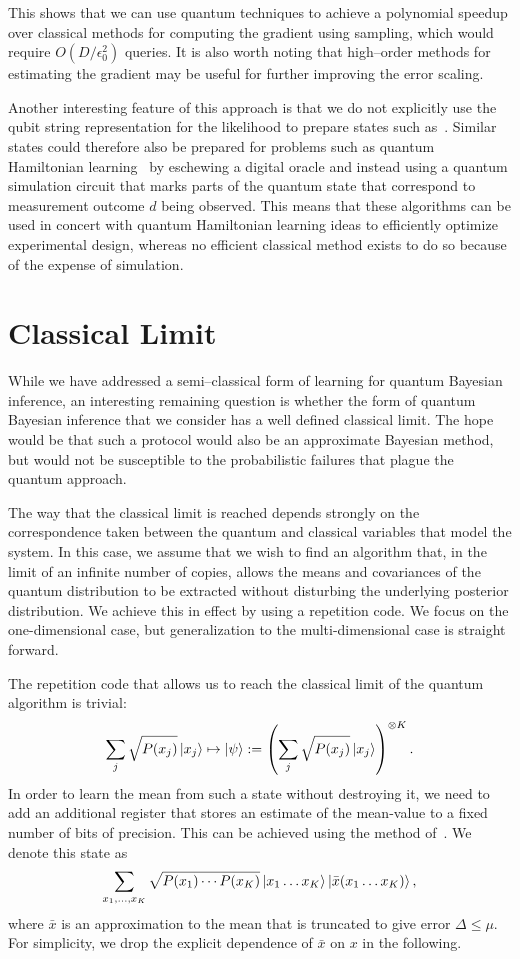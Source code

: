 \documentclass[aps,amsmath,onecolumn,amssymb]{revtex4}
\begin{document}
This shows that we can use quantum techniques to achieve a polynomial speedup over classical methods for computing the gradient using sampling, which would require $O(D/\epsilon_0^2)$ queries.  It is also worth noting that high--order methods for estimating the gradient may be useful for further improving the error scaling.

Another interesting feature of this approach is that we do not explicitly use the qubit string representation for the likelihood to prepare states such as~.   Similar states could therefore also be prepared for problems such as quantum Hamiltonian learning~\cite{WGF+14} by eschewing a digital oracle and instead using a quantum simulation circuit that marks parts of the quantum state that correspond to measurement outcome $d$ being observed.  This means that these algorithms can be used in concert with quantum Hamiltonian learning ideas to efficiently optimize experimental design, whereas no efficient classical method exists to do so because of the expense of simulation.

\section{Classical Limit}
While we have addressed a semi--classical form of learning for quantum Bayesian inference, an interesting remaining question is whether the form of quantum
Bayesian inference that we consider has a well defined classical limit.  The hope would be that such a protocol would also be an approximate Bayesian method, but would not be susceptible to the probabilistic failures that plague the quantum approach.

  The way that the classical limit is reached depends strongly on the correspondence taken between the quantum and classical variables that model the system.  In this case, we assume that we wish to find an algorithm that, in the limit of an infinite number of copies, allows the means and covariances of the quantum distribution to be extracted without disturbing the underlying posterior distribution.  We achieve this in effect by using a repetition code.  We focus on the one-dimensional case, but generalization to the multi-dimensional case is straight forward.

The repetition code that allows us to reach the classical limit of the quantum algorithm is trivial:
\begin{equation}
\sum_{j} \sqrt{P(x_j)} \left|x_j\right\rangle \mapsto \left|\psi\right\rangle:= \left(\sum_j \sqrt{P(x_j)} \left|x_j\right\rangle\right)^{\otimes K}.
\end{equation}
In order to learn the mean from such a state without destroying it, we need to add an additional register that stores an estimate of the mean-value to a fixed number of bits of precision.  This can be achieved using the method of~\cite{GR02}.  We denote this state as
\begin{equation}
\sum_{x_1,\ldots,x_K} \sqrt{P(x_1)\cdots P(x_K)} \left|x_1\ldots x_K\right\rangle \left|\bar{x}(x_1\ldots x_K)\right\rangle,
\end{equation}
where $\bar{x}$ is an approximation to the mean that is truncated to give error $\Delta\le \mu$.  For simplicity, we drop the explicit dependence of $\bar{x}$ on $x$ in the following.
\end{document}
